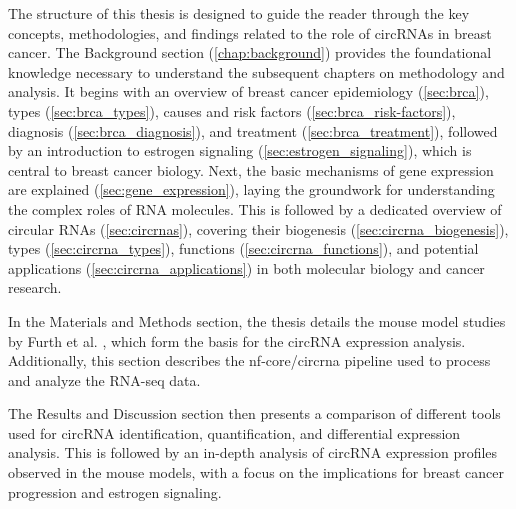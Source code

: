 The structure of this thesis is designed to guide the reader through the key
concepts, methodologies, and findings related to the role of circRNAs in breast
cancer.
The Background section (\cref{chap:background}) provides the foundational
knowledge necessary to understand the subsequent chapters on methodology and
analysis.
It begins with an overview of breast cancer epidemiology (\cref{sec:brca}),
types (\cref{sec:brca_types}), causes and risk factors
(\cref{sec:brca_risk-factors}), diagnosis (\cref{sec:brca_diagnosis}), and
treatment (\cref{sec:brca_treatment}), followed by an introduction to estrogen
signaling (\cref{sec:estrogen_signaling}), which is central to breast cancer
biology.
Next, the basic mechanisms of gene expression are explained
(\cref{sec:gene_expression}), laying the groundwork for understanding the
complex roles of RNA molecules.
This is followed by a dedicated overview of circular RNAs
(\cref{sec:circrnas}), covering their biogenesis
(\cref{sec:circrna_biogenesis}), types (\cref{sec:circrna_types}), functions
(\cref{sec:circrna_functions}), and potential applications
(\cref{sec:circrna_applications}) in both molecular biology and cancer
research.

In the Materials and Methods section, the thesis details the mouse model
studies by Furth et al.
\supercite{furth_esr1_2023,furth_overexpression_2023},
which form the basis for the circRNA expression
analysis.
Additionally, this section describes the nf-core/circrna
pipeline\supercite{digby_nf-corecircrna_2023} used to process and analyze the
RNA-seq data.

The Results and Discussion section then presents a comparison of different
tools used for circRNA identification, quantification, and differential
expression analysis.
This is followed by an in-depth analysis of circRNA expression profiles
observed in the mouse models, with a focus on the implications for breast
cancer progression and estrogen signaling.
